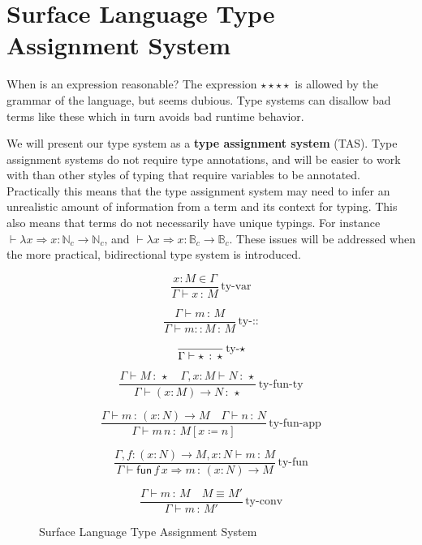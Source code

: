 \section{Surface Language Type Assignment System}

When is an expression reasonable? The expression $\star\star\star\star$ is allowed by the grammar of the language, but seems dubious.
Type systems can disallow bad terms like these which in turn avoids bad runtime behavior.

We will present our type system as a \textbf{type assignment system} (\ac{TAS}).
Type assignment systems do not require type annotations, and will be easier to work with than other styles of typing that require variables to be annotated.
Practically this means that the type assignment system may need to infer an unrealistic amount of information from a term and its context for typing.
This also means that terms do not necessarily have unique typings.
For instance $\vdash\lambda x\Rightarrow x:\mathbb{N}_{c}\rightarrow\mathbb{N}_{c}$, and $\vdash\lambda x\Rightarrow x:\mathbb{B}_{c}\rightarrow\mathbb{B}_{c}$.
These issues will be addressed when the more practical, bidirectional type system is introduced. 

\begin{figure}
\[
\frac{x:M\in\Gamma}{\Gamma\vdash x\,:\,M}\,\textrm{ty-var}
\]

\[
\frac{\Gamma\vdash m\,:\,M}{\Gamma\vdash m::M\,:\,M}\,\textrm{ty-::}
\]

\[
\frac{{\color{gray}\ }}{\Gamma\vdash\star\,:\,\star}\,\textrm{ty-}\star
\]

\[
\frac{\Gamma\vdash M\,:\,\star\quad\Gamma,x:M\vdash N\,:\,\star}{\Gamma\vdash\left(x:M\right)\rightarrow N\,:\,\star}\,\textrm{ty-fun-ty}
\]

\[
\frac{\Gamma\vdash m\,:\,\left(x:N\right)\rightarrow M\quad\Gamma\vdash n\,:\,N}{\Gamma\vdash m\,n\,:\,M\left[x\coloneqq n\right]}\,\textrm{ty-fun-app}
\]

\[
\frac{\Gamma,f:\left(x:N\right)\rightarrow M,x:N\vdash m\,:\,M}{\Gamma\vdash\mathsf{fun}\,f\,x\Rightarrow m\,:\,\left(x:N\right)\rightarrow M}\,\textrm{ty-fun}
\]

\[
\frac{\Gamma\vdash m\,:\,M\quad M\equiv M'}{\Gamma\vdash m\,:\,M'}\,\textrm{ty-conv}
\]


\caption{Surface Language Type Assignment System}
\label{fig:surface-TAS}
\end{figure}

